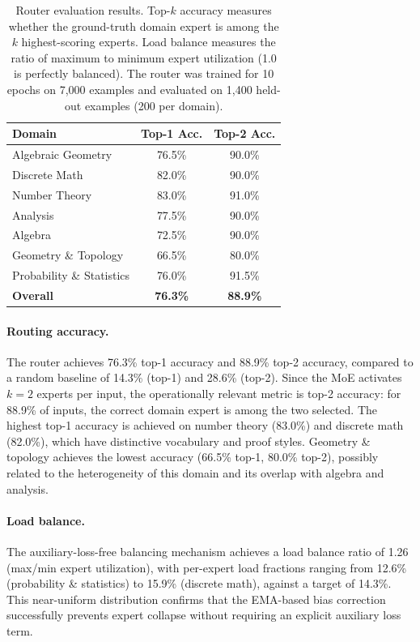 \documentclass[11pt,a4paper]{article}
\begin{document}
\begin{table}[t]
\centering
\caption{Router evaluation results. Top-$k$ accuracy measures whether the ground-truth domain expert is among the $k$ highest-scoring experts. Load balance measures the ratio of maximum to minimum expert utilization (1.0 is perfectly balanced). The router was trained for 10 epochs on 7,000 examples and evaluated on 1,400 held-out examples (200 per domain).}
\label{tab:router_eval}
\small
\begin{tabular}{@{}lcc@{}}
\toprule
\textbf{Domain} & \textbf{Top-1 Acc.} & \textbf{Top-2 Acc.} \\
\midrule
Algebraic Geometry & 76.5\% & 90.0\% \\
Discrete Math & 82.0\% & 90.0\% \\
Number Theory & 83.0\% & 91.0\% \\
Analysis & 77.5\% & 90.0\% \\
Algebra & 72.5\% & 90.0\% \\
Geometry \& Topology & 66.5\% & 80.0\% \\
Probability \& Statistics & 76.0\% & 91.5\% \\
\midrule
\textbf{Overall} & \textbf{76.3\%} & \textbf{88.9\%} \\
\bottomrule
\end{tabular}
\end{table}

\paragraph{Routing accuracy.}
The router achieves 76.3\% top-1 accuracy and 88.9\% top-2 accuracy, compared to a random baseline of 14.3\% (top-1) and 28.6\% (top-2). Since the MoE activates $k{=}2$ experts per input, the operationally relevant metric is top-2 accuracy: for 88.9\% of inputs, the correct domain expert is among the two selected. The highest top-1 accuracy is achieved on number theory (83.0\%) and discrete math (82.0\%), which have distinctive vocabulary and proof styles. Geometry \& topology achieves the lowest accuracy (66.5\% top-1, 80.0\% top-2), possibly related to the heterogeneity of this domain and its overlap with algebra and analysis.

\paragraph{Load balance.}
The auxiliary-loss-free balancing mechanism achieves a load balance ratio of 1.26 (max/min expert utilization), with per-expert load fractions ranging from 12.6\% (probability \& statistics) to 15.9\% (discrete math), against a target of 14.3\%. This near-uniform distribution confirms that the EMA-based bias correction successfully prevents expert collapse without requiring an explicit auxiliary loss term.
\end{document}
